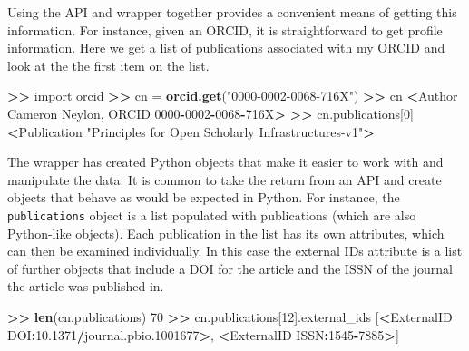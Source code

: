 \documentclass[]{krantz}
\newenvironment{Shaded}{\begin{snugshade}}{\end{snugshade}}
\newcommand{\KeywordTok}[1]{\textcolor[rgb]{0.13,0.29,0.53}{\textbf{#1}}}
\newcommand{\DecValTok}[1]{\textcolor[rgb]{0.00,0.00,0.81}{#1}}
\newcommand{\FloatTok}[1]{\textcolor[rgb]{0.00,0.00,0.81}{#1}}
\newcommand{\StringTok}[1]{\textcolor[rgb]{0.31,0.60,0.02}{#1}}
\newcommand{\OperatorTok}[1]{\textcolor[rgb]{0.81,0.36,0.00}{\textbf{#1}}}
\newcommand{\ErrorTok}[1]{\textcolor[rgb]{0.64,0.00,0.00}{\textbf{#1}}}
\newcommand{\NormalTok}[1]{#1}
\begin{document}
Using the API and wrapper together provides a convenient means of
getting this information. For instance, given an ORCID, it is
straightforward to get profile information. Here we get a list of
publications associated with my ORCID and look at the the first item on
the list.

\begin{Shaded}
\begin{Highlighting}[]
\OperatorTok{>}\ErrorTok{>}\StringTok{ }\NormalTok{import orcid}
\OperatorTok{>}\ErrorTok{>}\StringTok{ }\NormalTok{cn =}\StringTok{ }\KeywordTok{orcid.get}\NormalTok{(}\StringTok{"0000-0002-0068-716X"}\NormalTok{)}
\OperatorTok{>}\ErrorTok{>}\StringTok{ }\NormalTok{cn}
\OperatorTok{<}\NormalTok{Author Cameron Neylon, ORCID }\DecValTok{0000}\OperatorTok{-}\DecValTok{0002}\OperatorTok{-}\DecValTok{0068}\OperatorTok{-}\NormalTok{716X}\OperatorTok{>}
\ErrorTok{>>}\StringTok{ }\NormalTok{cn.publications[}\DecValTok{0}\NormalTok{]}
\OperatorTok{<}\NormalTok{Publication }\StringTok{"Principles for Open Scholarly Infrastructures-v1"}\OperatorTok{>}
\end{Highlighting}
\end{Shaded}

The wrapper has created Python objects that make it easier to work with
and manipulate the data. It is common to take the return from an API and
create objects that behave as would be expected in Python. For instance,
the \texttt{publications} object is a list populated with publications
(which are also Python-like objects). Each publication in the list has
its own attributes, which can then be examined individually. In this
case the external IDs attribute is a list of further objects that
include a DOI for the article and the ISSN of the journal the article
was published in.

\begin{Shaded}
\begin{Highlighting}[]
\OperatorTok{>}\ErrorTok{>}\StringTok{ }\KeywordTok{len}\NormalTok{(cn.publications)}
\DecValTok{70}
\OperatorTok{>}\ErrorTok{>}\StringTok{ }\NormalTok{cn.publications[}\DecValTok{12}\NormalTok{].external_ids}
\NormalTok{[}\OperatorTok{<}\NormalTok{ExternalID DOI}\OperatorTok{:}\FloatTok{10.1371}\OperatorTok{/}\NormalTok{journal.pbio.}\DecValTok{1001677}\OperatorTok{>}\NormalTok{, }\OperatorTok{<}\NormalTok{ExternalID ISSN}\OperatorTok{:}\DecValTok{1545}\OperatorTok{-}\DecValTok{7885}\OperatorTok{>}\NormalTok{]}
\end{Highlighting}
\end{Shaded}
\end{document}

